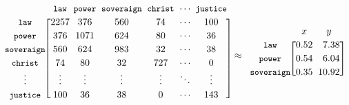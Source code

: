 \documentclass[11pt]{article}
\begin{document}
\begin{figure}[ht!]
	\centering
	\[\arraycolsep=1.8pt\def\arraystretch{1.2}
	\begin{blockarray}{c@{\hspace{2mm}}c@{\hspace{1.5mm}}c@{\hspace{2mm}}c@{\hspace{2mm}}c@{\hspace{2mm}}c@{\hspace{1.8mm}}c@{\hspace{1.8mm}}c}
		& \texttt{\small{law}} & \texttt{\small{power}} & \texttt{\small{soveraign}} & \texttt{\small{christ}} & \cdots & \texttt{\small{justice}} \\
		\begin{block}{c@{\hspace{2mm}}[c@{\hspace{1.5mm}}c@{\hspace{2mm}}c@{\hspace{2mm}}c@{\hspace{2mm}}c@{\hspace{1.8mm}}c@{\hspace{1.8mm}}c]}
			\texttt{\small{law}} & 2257 & 376 & 560 & 74 & \cdots & 100 \\
			\texttt{\small{power}} & 376 & 1071 & 624 & 80 & \cdots & 36 \\
			\texttt{\small{soveraign}} & 560 & 624 & 983 & 32 & \cdots & 38 \\
			\texttt{\small{christ}} & 74 & 80 & 32 & 727 & \cdots & 0 \\
			\vdots & \vdots & \vdots & \vdots & \vdots & \ddots & \vdots \\
			\texttt{\small{justice}} & 100 & 36 & 38 & 0 & \cdots & 143 \\
		\end{block}
	\end{blockarray} 
	\approx
	\begin{blockarray}{c@{\hspace{2mm}}c@{\hspace{2mm}}c}
		& x & y \\
		\begin{block}{c@{\hspace{2mm}}[r@{\hspace{2mm}}r]}
			\texttt{\small{law}} & 0.52 & 7.38 \\
			\texttt{\small{power}} & 0.54 & 6.04 \\
			\texttt{\small{soveraign}} & 0.35 & 10.92 \\

\end{block}
\end{blockarray}\]
\end{figure}
\end{document}
